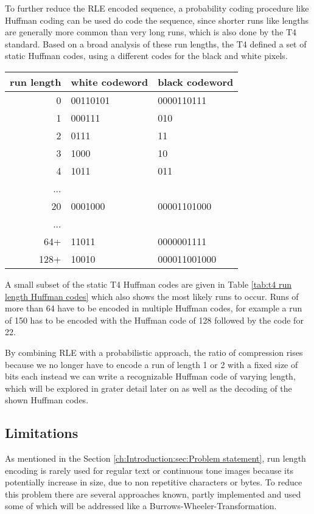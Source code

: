 \par{
To further reduce the RLE encoded sequence, a probability coding procedure like Huffman coding can be used do code the sequence, since shorter runs like lengths are generally more common than very long runs, which is also done by the T4 standard. Based on a broad analysis of these run lengths, the T4 defined a set of static Huffman codes, using a different codes for the black and white pixels.
}
\begin{center}
	\begin{tabular}[p]{r|l|l}
		
		run length &  white codeword & black codeword\\
		\hline
		0 &  00110101 & 0000110111\\
		1 & 000111 & 010\\
		2 & 0111 & 11\\
		3 & 1000 & 10\\
		4 & 1011 & 011\\
		... &  & \\
		20 & 0001000 & 00001101000\\
		... & & \\
		64+ & 11011 & 0000001111\\
		128+ & 10010 & 000011001000
		\label{tab:t4 run length Huffman codes}
	\end{tabular}
\end{center}

\par{
A small subset of the static T4 Huffman codes are given in Table \ref{tab:t4 run length Huffman
	codes} which also shows the most likely runs to occur. Runs of more than 64 have to be encoded in multiple Huffman codes, for example a run of 150 has to be encoded with the Huffman code of 128 followed by the code for 22.
}
\par{
By combining RLE with a probabilistic approach, the ratio of compression rises because we no longer have to encode a run of length 1 or 2 with a fixed size of bits each instead we can write a recognizable Huffman code of varying length, which will be explored in grater detail later on as well as the decoding of the shown Huffman codes.}

\subsection{Limitations}
\par{
As mentioned in the Section \ref{ch:Introduction:sec:Problem statement}, run length encoding is rarely used for regular text or continuous tone images because its potentially increase in size, due to non repetitive characters or bytes. To reduce this problem there are several approaches known, partly implemented and used some of which will be addressed like a Burrows-Wheeler-Transformation.
}

